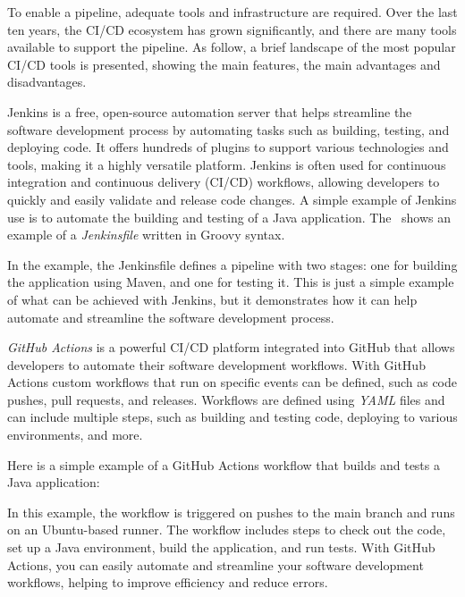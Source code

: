To enable a pipeline, adequate tools and infrastructure are required. Over the last ten years, the CI/CD ecosystem has grown significantly,
and there are many tools available to support the pipeline.
As follow, a brief landscape of the most popular CI/CD tools is presented, showing the main features, the main advantages and disadvantages.

Jenkins is a free, open-source automation server that helps streamline the software development process by automating tasks such as building,
testing, and deploying code. It offers hundreds of plugins to support various technologies and tools, making it a highly versatile platform. Jenkins
is often used for continuous integration and continuous delivery (CI/CD) workflows, allowing developers to quickly and easily validate and release
code changes. A simple example of Jenkins use is to automate the building and testing of a Java application. The~ shows an example of a \emph{Jenkinsfile} written in Groovy syntax.



In the example, the Jenkinsfile defines a pipeline with two stages: one for building the application using Maven, and one for testing it. This is
just a simple example of what can be achieved with Jenkins, but it demonstrates how it can help automate and streamline the software development
process.

\emph{GitHub Actions} is a powerful CI/CD platform integrated into GitHub that allows developers to automate their software development workflows.
With GitHub Actions custom workflows that run on specific events can be defined, such as code pushes, pull requests, and releases. Workflows are
defined using \emph{YAML} files and can include multiple steps, such as building and testing code, deploying to various environments, and more.

Here is a simple example of a GitHub Actions workflow that builds and tests a Java application:



In this example, the workflow is triggered on pushes to the main branch and runs on an Ubuntu-based runner. The workflow includes steps to
check out the code, set up a Java environment, build the application, and run tests. With GitHub Actions, you can easily
automate and streamline your software development workflows, helping to improve efficiency and reduce errors.

